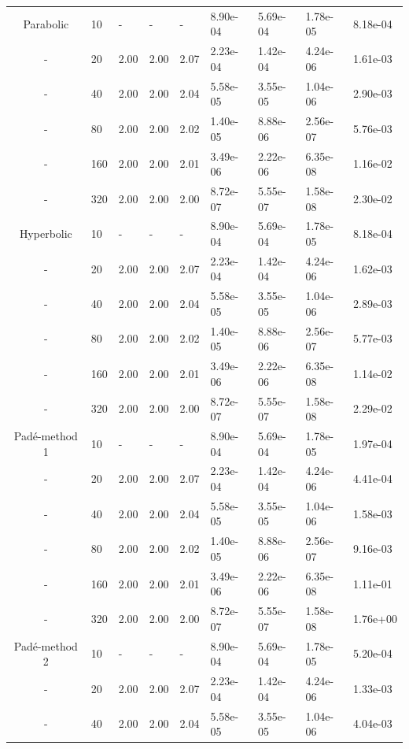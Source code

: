 \begin{table}[p]
{\begin{tabular}{cllllllll}
   \hline
      Parabolic  & 10 & - & - & - & 8.90e-04 & 5.69e-04 & 1.78e-05 & 8.18e-04 \\ 
      - &   20 & 2.00 & 2.00 & 2.07 & 2.23e-04 & 1.42e-04 & 4.24e-06 & 1.61e-03 \\ 
      - &   40 & 2.00 & 2.00 & 2.04 & 5.58e-05 & 3.55e-05 & 1.04e-06 & 2.90e-03 \\ 
      - &   80 & 2.00 & 2.00 & 2.02 & 1.40e-05 & 8.88e-06 & 2.56e-07 & 5.76e-03 \\ 
      - &  160 & 2.00 & 2.00 & 2.01 & 3.49e-06 & 2.22e-06 & 6.35e-08 & 1.16e-02 \\ 
      - &  320 & 2.00 & 2.00 & 2.00 & 8.72e-07 & 5.55e-07 & 1.58e-08 & 2.30e-02 \\ 
   \hline
     Hyperbolic  & 10 & - & - & - & 8.90e-04 & 5.69e-04 & 1.78e-05 & 8.18e-04 \\ 
     - &   20 & 2.00 & 2.00 & 2.07 & 2.23e-04 & 1.42e-04 & 4.24e-06 & 1.62e-03 \\ 
     - &   40 & 2.00 & 2.00 & 2.04 & 5.58e-05 & 3.55e-05 & 1.04e-06 & 2.89e-03 \\ 
     - &   80 & 2.00 & 2.00 & 2.02 & 1.40e-05 & 8.88e-06 & 2.56e-07 & 5.77e-03 \\ 
     - &  160 & 2.00 & 2.00 & 2.01 & 3.49e-06 & 2.22e-06 & 6.35e-08 & 1.14e-02 \\ 
     - &  320 & 2.00 & 2.00 & 2.00 & 8.72e-07 & 5.55e-07 & 1.58e-08 & 2.29e-02 \\ 
   \hline
   Pad\'e-method 1 &  10 & - & - & - & 8.90e-04 & 5.69e-04 & 1.78e-05 & 1.97e-04 \\ 
   - &   20 & 2.00 & 2.00 & 2.07 & 2.23e-04 & 1.42e-04 & 4.24e-06 & 4.41e-04 \\ 
   - &   40 & 2.00 & 2.00 & 2.04 & 5.58e-05 & 3.55e-05 & 1.04e-06 & 1.58e-03 \\ 
   - &   80 & 2.00 & 2.00 & 2.02 & 1.40e-05 & 8.88e-06 & 2.56e-07 & 9.16e-03 \\ 
   - &  160 & 2.00 & 2.00 & 2.01 & 3.49e-06 & 2.22e-06 & 6.35e-08 & 1.11e-01 \\ 
   - &  320 & 2.00 & 2.00 & 2.00 & 8.72e-07 & 5.55e-07 & 1.58e-08 & 1.76e+00 \\ 
   \hline
   Pad\'e-method 2 &  10 & - & - & - & 8.90e-04 & 5.69e-04 & 1.78e-05 & 5.20e-04 \\ 
   - &    20 & 2.00 & 2.00 & 2.07 & 2.23e-04 & 1.42e-04 & 4.24e-06 & 1.33e-03 \\ 
   - &    40 & 2.00 & 2.00 & 2.04 & 5.58e-05 & 3.55e-05 & 1.04e-06 & 4.04e-03 \\ 

\end{tabular}}
\end{table}

